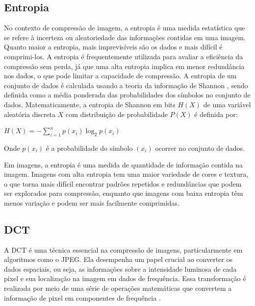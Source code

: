 \subsection{Entropia}
No contexto de compressão de imagem, a entropia é uma medida estatística que se refere à incerteza ou aleatoriedade das informações contidas em uma imagem. Quanto maior a entropia, mais imprevisíveis são os dados e mais difícil é comprimi-los. A entropia é frequentemente utilizada para  avaliar a eficiência da compressão sem perda, já que uma alta entropia implica em menor redundância nos dados, o que pode limitar a capacidade de compressão. A entropia de um conjunto de dados é calculada usando a teoria da informação de Shannon \cite{dataCopressionSayood}, sendo definida como a média ponderada das probabilidades dos símbolos no conjunto de dados. Matematicamente, a entropia de Shannon em bits $H(X)$ de uma variável aleatória discreta $X$ com distribuição de probabilidade $P(X)$ é definida por:
\BlankLine
\begin{center}
    \(\displaystyle H(X) = - \sum_{i=1}^{n} p(x_i) \log_2 p(x_i)\)
\end{center}

\noindent Onde $p(x_i)$ é a probabilidade do símbolo $(x_i)$ ocorrer no conjunto de dados.

Em imagens, a entropia é uma medida de quantidade de informação contida na imagem. Imagens com alta entropia tem uma maior variedade de cores e textura, o que torna mais difícil encontrar padrões repetidos e redundâncias que podem ser explorados para compressão, enquanto que imagens com baixa entropia têm menos variação e podem ser mais facilmente comprimidas. 

\subsection{\acrfull{DCT}}
A \acrfull{DCT} é uma técnica essencial na compressão de imagens, particularmente em algoritmos como o \acrshort{JPEG}. Ela desempenha um papel crucial ao converter os dados espaciais, ou seja, as informações sobre  a intensidade luminosa de cada pixel e sua localização na imagem em dados de frequência. Essa transformação é realizada por meio de uma série de operações matemáticas que convertem a informação de pixel em componentes de frequência \cite{digitalImageProcessingGonzalez}.

